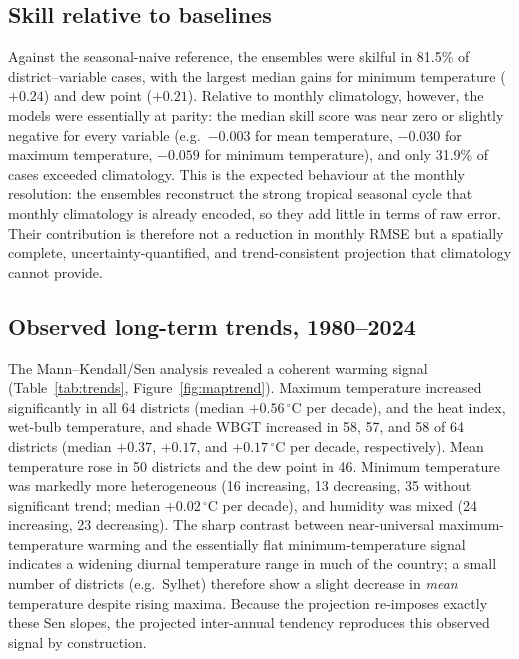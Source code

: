 \documentclass[review,11pt]{elsarticle}
\newcommand{\degC}{\ensuremath{^{\circ}\mathrm{C}}}
\begin{document}
\begin{table}[htbp]
\centering
\caption{External validation of the projected 2025 fields against observed 2025,
summarised as the median across 64 districts. Errors are in each variable's
native unit ($\degC$ for temperatures and thermal indices; \% for humidity;
W\,m$^{-2}$ for solar radiation; index units for UV; $\degC$\,d\,d$^{-1}$ for
CDD).}
\label{tab:validation}

\end{table}

\subsection{Skill relative to baselines}\label{sec:res-skill}
Against the seasonal-naive reference, the ensembles were skilful in 81.5\% of
district--variable cases, with the largest median gains for minimum temperature
($+0.24$) and dew point ($+0.21$). Relative to monthly climatology, however, the
models were essentially at parity: the median skill score was near zero or
slightly negative for every variable (e.g.\ $-0.003$ for mean temperature,
$-0.030$ for maximum temperature, $-0.059$ for minimum temperature), and only
31.9\% of cases exceeded climatology. This is the expected behaviour at the monthly
resolution: the ensembles reconstruct the strong tropical seasonal cycle that
monthly climatology is already encoded, so they add little in terms of raw error. Their
contribution is therefore not a reduction in monthly RMSE but a spatially
complete, uncertainty-quantified, and trend-consistent projection that
climatology cannot provide.

\subsection{Observed long-term trends, 1980--2024}\label{sec:res-trend}
The Mann--Kendall/Sen analysis revealed a coherent warming signal
(Table~\ref{tab:trends}, Figure~\ref{fig:maptrend}). Maximum temperature
increased significantly in all 64 districts (median $+0.56\,\degC$ per decade),
and the heat index, wet-bulb temperature, and shade WBGT increased in 58, 57, and
58 of 64 districts (median $+0.37$, $+0.17$, and $+0.17\,\degC$ per decade,
respectively). Mean temperature rose in 50 districts and the dew point in 46. Minimum
temperature was markedly more heterogeneous (16 increasing, 13 decreasing, 35
without significant trend; median $+0.02\,\degC$ per decade), and humidity was
mixed (24 increasing, 23 decreasing). The sharp contrast between near-universal
maximum-temperature warming and the essentially flat minimum-temperature signal
indicates a widening diurnal temperature range in much of the country; a small
number of districts (e.g.\ Sylhet) therefore show a slight decrease in \emph{mean}
temperature despite rising maxima. Because the projection re-imposes exactly these
Sen slopes, the projected inter-annual tendency reproduces this observed signal by
construction.
\end{document}
